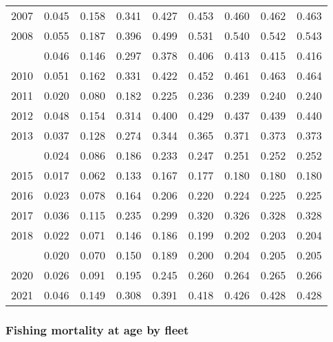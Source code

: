 \documentclass[
]{article}
\begin{document}
\begin{longtable}[t]{lrrrrrrrr}
2007 & 0.045 & 0.158 & 0.341 & 0.427 & 0.453 & 0.460 & 0.462 & 0.463\\
2008 & 0.055 & 0.187 & 0.396 & 0.499 & 0.531 & 0.540 & 0.542 & 0.543\\
\addlinespace
2009 & 0.046 & 0.146 & 0.297 & 0.378 & 0.406 & 0.413 & 0.415 & 0.416\\
2010 & 0.051 & 0.162 & 0.331 & 0.422 & 0.452 & 0.461 & 0.463 & 0.464\\
2011 & 0.020 & 0.080 & 0.182 & 0.225 & 0.236 & 0.239 & 0.240 & 0.240\\
2012 & 0.048 & 0.154 & 0.314 & 0.400 & 0.429 & 0.437 & 0.439 & 0.440\\
2013 & 0.037 & 0.128 & 0.274 & 0.344 & 0.365 & 0.371 & 0.373 & 0.373\\
\addlinespace
2014 & 0.024 & 0.086 & 0.186 & 0.233 & 0.247 & 0.251 & 0.252 & 0.252\\
2015 & 0.017 & 0.062 & 0.133 & 0.167 & 0.177 & 0.180 & 0.180 & 0.180\\
2016 & 0.023 & 0.078 & 0.164 & 0.206 & 0.220 & 0.224 & 0.225 & 0.225\\
2017 & 0.036 & 0.115 & 0.235 & 0.299 & 0.320 & 0.326 & 0.328 & 0.328\\
2018 & 0.022 & 0.071 & 0.146 & 0.186 & 0.199 & 0.202 & 0.203 & 0.204\\
\addlinespace
2019 & 0.020 & 0.070 & 0.150 & 0.189 & 0.200 & 0.204 & 0.205 & 0.205\\
2020 & 0.026 & 0.091 & 0.195 & 0.245 & 0.260 & 0.264 & 0.265 & 0.266\\
2021 & 0.046 & 0.149 & 0.308 & 0.391 & 0.418 & 0.426 & 0.428 & 0.428\\*
\end{longtable}

\hypertarget{fishing-mortality-at-age-by-fleet}{%
\subsubsection{Fishing mortality at age by
fleet}\label{fishing-mortality-at-age-by-fleet}}
\end{document}
